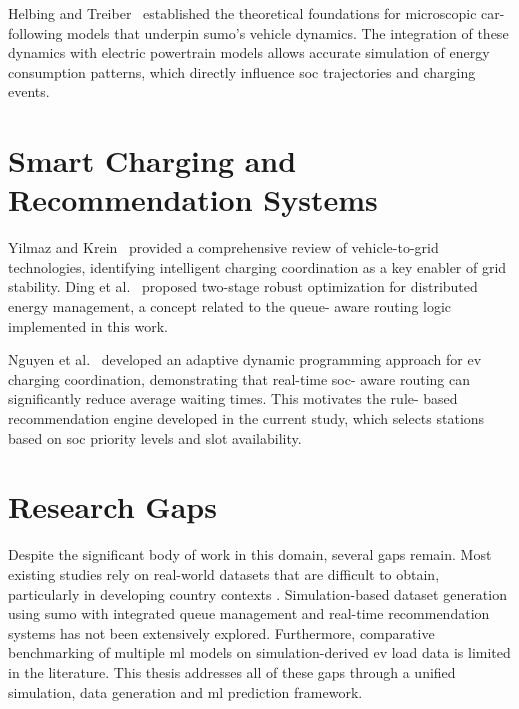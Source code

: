 \documentclass{thesis-library}
\begin{document}
Helbing and Treiber~\cite{ev_simulation2020} established the theoretical foundations for
microscopic car-following models that underpin \Gls{sumo}'s vehicle dynamics. The
integration of these dynamics with electric powertrain models allows accurate simulation
of energy consumption patterns, which directly influence \Gls{soc} trajectories and
charging events.

\section{Smart Charging and Recommendation Systems}

Yilmaz and Krein~\cite{smart_charging2022} provided a comprehensive review of
vehicle-to-grid technologies, identifying intelligent charging coordination as a key
enabler of grid stability. Ding et al.~\cite{queue_management2023} proposed two-stage
robust optimization for distributed energy management, a concept related to the queue-
aware routing logic implemented in this work.

Nguyen et al.~\cite{demand_response2023} developed an adaptive dynamic programming
approach for \Gls{ev} charging coordination, demonstrating that real-time \Gls{soc}-
aware routing can significantly reduce average waiting times. This motivates the rule-
based recommendation engine developed in the current study, which selects stations based
on \Gls{soc} priority levels and slot availability.

\section{Research Gaps}

Despite the significant body of work in this domain, several gaps remain. Most existing
studies rely on real-world datasets that are difficult to obtain, particularly in
developing country contexts \cite{ev_bangladesh2023}. Simulation-based dataset generation
using \Gls{sumo} with integrated queue management and real-time recommendation systems
has not been extensively explored. Furthermore, comparative benchmarking of multiple
\Gls{ml} models on simulation-derived \Gls{ev} load data is limited in the literature.
This thesis addresses all of these gaps through a unified simulation, data generation
and \Gls{ml} prediction framework.

\end{document}
